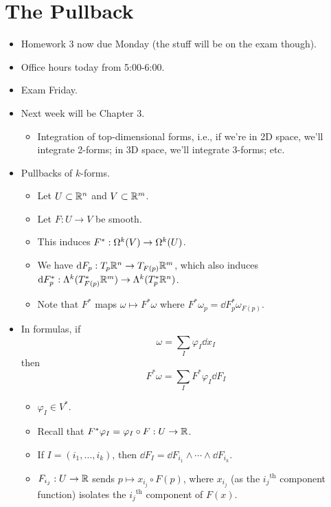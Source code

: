 \documentclass[../notes.tex]{subfiles}
\begin{document}
\section{The Pullback}
\begin{itemize}
    \item {}Homework 3 now due Monday (the stuff will be on the exam though).
    \item Office hours today from 5:00-6:00.
    \item Exam Friday.
    \item Next week will be Chapter 3.
    \begin{itemize}
        \item Integration of top-dimensional forms, i.e., if we're in 2D space, we'll integrate 2-forms; in 3D space, we'll integrate 3-forms; etc.
    \end{itemize}
    \item Pullbacks of $k$-forms.
    \begin{itemize}
        \item Let $U\subset\R^n$ and $V\subset\R^m$.
        \item Let $F:U\to V$ be smooth.
        \item This induces $F^*:\ome[k]{V}\to\ome[k]{U}$.
        \item We have $\dd{F_p}:T_p\R^n\to T_{F(p)}\R^m$, which also induces $\dd{F_p^*}:\lam[k]{T_{F(p)}^*\R^m}\to\lam[k]{T_p^*\R^n}$.
        \item Note that $F^*$ maps $\omega\mapsto F^*\omega$ where $F^*\omega_p=\dd{F_p^*\omega_{F(p)}}$.
    \end{itemize}
    \item In formulas, if
    \begin{equation*}
        \omega = \sum_I\varphi_I\dd{x_I}
    \end{equation*}
    then
    \begin{equation*}
        F^*\omega = \sum_IF^*\varphi_I\dd{F_I}
    \end{equation*}
    \begin{itemize}
        \item $\varphi_I\in V^*$.
        \item Recall that $F^*\varphi_I=\varphi_I\circ F:U\to\R$.
        \item If $I=(i_1,\dots,i_k)$, then $\dd{F_I}=\dd{F_{i_1}}\wedge\cdots\wedge\dd{F_{i_k}}$.
        \item $F_{i_j}:U\to\R$ sends $p\mapsto x_{i_j}\circ F(p)$, where $x_{i_j}$ (as the ${i_j}^\text{th}$ component function) isolates the ${i_j}^\text{th}$ component of $F(x)$.

\end{itemize}
\end{itemize}
\end{document}
